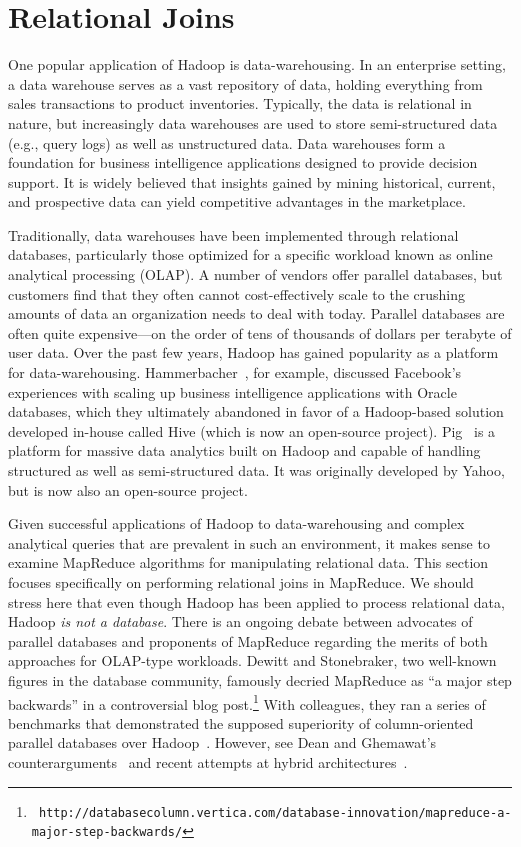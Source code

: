 \section{Relational Joins}
\label{chapter3:joins}

One popular application of Hadoop is data-warehousing.  In an
enterprise setting, a data warehouse serves as a vast repository of
data, holding everything from sales transactions to product
inventories.  Typically, the data is relational in nature, but
increasingly data warehouses are used to store semi-structured data
(e.g., query logs) as well as unstructured data.  Data warehouses form
a foundation for business intelligence applications designed to
provide decision support.  It is widely believed that insights gained
by mining historical, current, and prospective data can yield
competitive advantages in the marketplace.

Traditionally, data warehouses have been implemented through
relational databases, particularly those optimized for a specific
workload known as online analytical processing (OLAP).  A number of
vendors offer parallel databases, but customers find that they often
cannot cost-effectively scale to the crushing amounts of data an
organization needs to deal with today.  Parallel databases are often
quite expensive---on the order of tens of thousands of dollars per
terabyte of user data.  Over the past few years, Hadoop has gained
popularity as a platform for data-warehousing.
Hammerbacher~\cite{Hammerbacher_2009}, for example, discussed
Facebook's experiences with scaling up business intelligence
applications with Oracle databases, which they ultimately abandoned in
favor of a Hadoop-based solution developed in-house called Hive (which
is now an open-source project).  Pig~\cite{Olston_etal_SIGMOD2008} is
a platform for massive data analytics built on Hadoop and capable of
handling structured as well as semi-structured data.  It was
originally developed by Yahoo, but is now also an open-source project.

Given successful applications of Hadoop to data-warehousing and
complex analytical queries that are prevalent in such an environment,
it makes sense to examine MapReduce algorithms for manipulating
relational data.  This section focuses specifically on performing
relational joins in MapReduce.  We should stress here that even though
Hadoop has been applied to process relational data, Hadoop {\it is not
  a database}.  There is an ongoing debate between advocates of
parallel databases and proponents of MapReduce regarding the merits of
both approaches for OLAP-type workloads.  Dewitt and Stonebraker, two
well-known figures in the database community, famously decried
MapReduce as ``a major step backwards'' in a controversial blog
post.\footnote{\tt
  http://databasecolumn.vertica.com/database-innovation/mapreduce-a-major-step-backwards/}
With colleagues, they ran a series of benchmarks that demonstrated the
supposed superiority of column-oriented parallel databases over
Hadoop~\cite{Pavlo_etal_SIGMOD2009,Stonebraker_etal_CACM2010}. However,
see Dean and Ghemawat's counterarguments~\cite{Dean_Ghemawat_CACM2010}
and recent attempts at hybrid
architectures~\cite{Abouzeid_etal_VLDB2009}.

